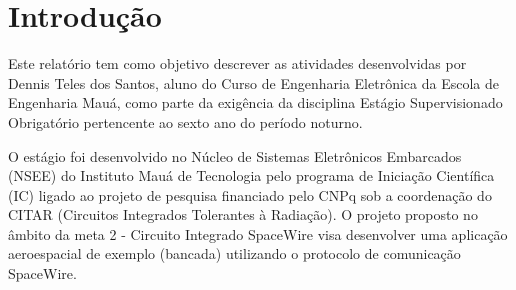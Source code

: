 \documentclass[
	12pt,				%
	openright,			%
	twoside,			%
	a4paper,			%
	english,			%
	french,				%
	spanish,			%
	brazil				%
	]{abntex2}
\begin{document}
\fi

\tableofcontents*
\cleardoublepage



\textual

\chapter*[Introdução]{Introdução}

	Este relatório tem como objetivo descrever as atividades desenvolvidas por Dennis Teles dos Santos, aluno do Curso de Engenharia Eletrônica da Escola de Engenharia Mauá, como parte da exigência da disciplina Estágio Supervisionado Obrigatório pertencente ao sexto ano do período noturno.
	
	O estágio foi desenvolvido no Núcleo de Sistemas Eletrônicos Embarcados (NSEE) do Instituto Mauá de Tecnologia pelo programa de Iniciação Científica (IC) ligado ao projeto de pesquisa financiado pelo CNPq sob a coordenação do CITAR (Circuitos Integrados Tolerantes à Radiação). O projeto proposto no âmbito da meta 2 - Circuito Integrado SpaceWire visa desenvolver uma aplicação aeroespacial de exemplo (bancada) utilizando o protocolo de comunicação SpaceWire.
	
\end{document}

